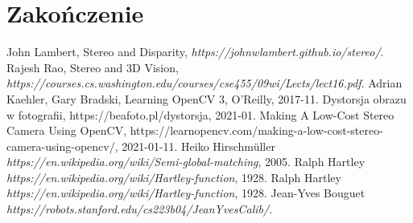 \documentclass[magisterska]{pracadypl}
\begin{document}
\chapter{Zakończenie}

\listoffigures

\begin{thebibliography}{7}

 John Lambert, Stereo and Disparity, \textit{https://johnwlambert.github.io/stereo/}.
 Rajesh Rao, Stereo and 3D Vision, \textit{https://courses.cs.washington.edu/courses/cse455/09wi/Lects/lect16.pdf}.
 Adrian Kaehler, Gary Bradski, Learning OpenCV 3, O'Reilly, 2017-11.
 Dystorsja obrazu w fotografii, https://beafoto.pl/dystorsja, 2021-01.
 Making A Low-Cost Stereo Camera Using OpenCV, https://learnopencv.com/making-a-low-cost-stereo-camera-using-opencv/, 2021-01-11.
 Heiko Hirschmüller \textit{https://en.wikipedia.org/wiki/Semi-global-matching}, 2005.
 Ralph Hartley \textit{https://en.wikipedia.org/wiki/Hartley-function}, 1928.
 Ralph Hartley \textit{https://en.wikipedia.org/wiki/Hartley-function}, 1928.
 Jean-Yves Bouguet \textit{https://robots.stanford.edu/cs223b04/JeanYvesCalib/}.

\end{thebibliography}
\end{document}
